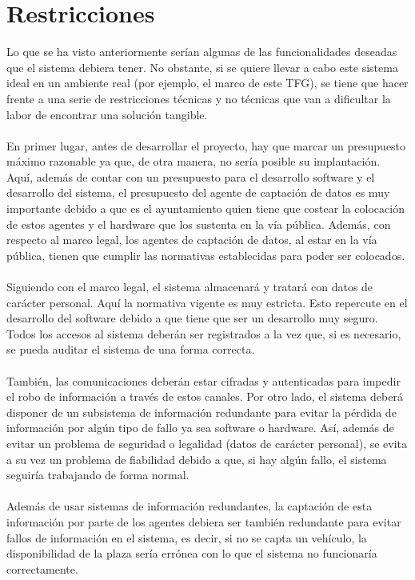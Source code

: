 \section{Restricciones}
Lo que se ha visto anteriormente serían algunas de las funcionalidades deseadas que el sistema debiera tener. No obstante, si se quiere llevar a cabo este sistema ideal en un ambiente real (por ejemplo, el marco de este TFG), se tiene que hacer frente a una serie de restricciones técnicas y no técnicas que van a dificultar la labor de encontrar una solución tangible.
\\\\
En primer lugar, antes de desarrollar el proyecto, hay que marcar un presupuesto máximo razonable ya que, de otra manera, no sería posible su implantación. Aquí, además de contar con un presupuesto para el desarrollo software y el desarrollo del sistema, el presupuesto del agente de captación de datos es muy importante debido a que es el ayuntamiento quien tiene que costear la colocación de estos agentes y el hardware que los sustenta en la vía pública. Además, con respecto al marco legal, los agentes de captación de datos, al estar en la vía pública, tienen que cumplir las normativas establecidas para poder ser colocados.
\\\\
Siguiendo con el marco legal, el sistema almacenará y tratará con datos de carácter personal. Aquí la normativa vigente es muy estricta. Esto repercute en el desarrollo del software debido a que tiene que ser un desarrollo muy seguro. Todos los accesos al sistema deberán ser registrados a la vez que, si es necesario, se pueda auditar el sistema de una forma correcta.
\\\\
También, las comunicaciones deberán estar cifradas y autenticadas para impedir el robo de información a través de estos canales. Por otro lado, el sistema deberá disponer de un subsistema de información redundante para evitar la pérdida de información por algún tipo de fallo ya sea software o hardware. Así, además de evitar un problema de seguridad o legalidad (datos de carácter personal), se evita a su vez un problema de fiabilidad debido a que, si hay algún fallo, el sistema seguiría trabajando de forma normal.
\\\\
Además de usar sistemas de información redundantes, la captación de esta información por parte de los agentes debiera ser también redundante para evitar fallos de información en el sistema, es decir, si no se capta un vehículo, la disponibilidad de la plaza sería errónea con lo que el sistema no funcionaría correctamente.
\newpage
